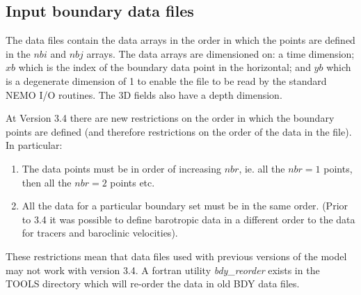 \subsection{Input boundary data files}
\label{BDY_data}

The data files contain the data arrays
in the order in which the points are defined in the $nbi$ and
$nbj$
arrays. The data arrays are dimensioned on: a time dimension;
$xb$ which is the index of the boundary data point in the
horizontal;
and $yb$ which is a degenerate dimension of 1 to enable the file
to be
read by the standard NEMO I/O routines. The 3D fields also have
a
depth dimension. 

At Version 3.4 there are new restrictions on the order in which
the
boundary points are defined (and therefore restrictions on the
order
of the data in the file). In particular:

\mbox{}

\begin{enumerate}
\item The data points must be in order of increasing $nbr$, ie.
all
  the $nbr=1$ points, then all the $nbr=2$ points etc.
\item All the data for a particular boundary set must be in the
same
order. (Prior to 3.4 it was possible to define barotropic data
in a
different order to the data for tracers and baroclinic
velocities).
\end{enumerate}

\mbox{}

These restrictions mean that data files used with previous
versions of
the model may not work with version 3.4. A fortran utility
{\it bdy\_reorder} exists in the TOOLS directory which will
re-order the
data in old BDY data files. 

